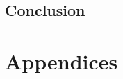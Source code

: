 \documentclass[twoside,hidelinks]{glasgowthesis}
\begin{document}










\chapter{Conclusion}


\part{Appendices}
\appendix



\newpage


\renewcommand*{\mkbibnamefamily}[1]{\textsc{#1}}
\renewcommand*{\mkbibnameprefix}[1]{\textsc{#1}}
\printbibliography[title={References}]
\end{document}

